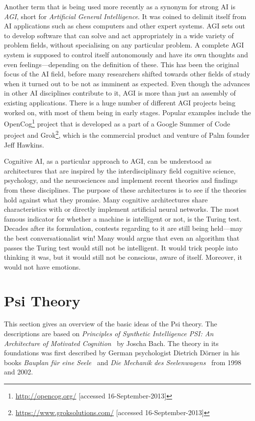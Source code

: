 Another term that is being used more recently as a synonym for strong AI is \emph{AGI}, short for \emph{Artificial General Intelligence}. It was coined to delimit itself from AI applications such as chess computers and other expert systems. AGI sets out to develop software that can solve and act appropriately in a wide variety of problem fields, without specialising on any particular problem. A complete AGI system is supposed to control itself autonomously and have its own thoughts and even feelings---depending on the definition of these. This has been the original focus of the AI field, before many researchers shifted towards other fields of study when it turned out to be not as imminent as expected. Even though the advances in other AI disciplines contribute to it, AGI is more than just an assembly of existing applications. There is a huge number of different AGI projects being worked on, with most of them being in early stages. Popular examples include the OpenCog\footnote{\url{http://opencog.org/} [accessed 16-September-2013]} project that is developed as a part of a Google Summer of Code project and Grok\footnote{\url{https://www.groksolutions.com/} [accessed 16-September-2013]}, which is the commercial product and venture of Palm founder Jeff Hawkins.~\cite{goertzel2007artificial} 

Cognitive AI, as a particular approach to AGI, can be understood as architectures that are inspired by the interdisciplinary field cognitive science, psychology, and the neurosciences and implement recent theories and findings from these disciplines. The purpose of these architectures is to see if the theories hold against what they promise. Many cognitive architectures share characteristics with or directly implement artificial neural networks. The most famous indicator for whether a machine is intelligent or not, is the Turing test. Decades after its formulation, contests regarding to it are still being held---may the best conversationalist win! Many would argue that even an algorithm that passes the Turing test would still not be intelligent. It would trick people into thinking it was, but it would still not be conscious, aware of itself. Moreover, it would not have emotions.~\cite{russell2009artificial}

    \section{Psi Theory}

This section gives an overview of the basic ideas of the Psi theory. The descriptions are based on \emph{Principles of Synthetic Intelligence PSI: An Architecture of Motivated Cognition}~\cite{Bach:2009:PSI:1611304} by Joscha Bach. The theory in its foundations was first described by German psychologist Dietrich Dörner in his books \emph{Bauplan für eine Seele}~\cite{Doerner1998} and \emph{Die Mechanik des Seelenwagens}~\cite{dorner2002mechanik} from 1998 and 2002.

